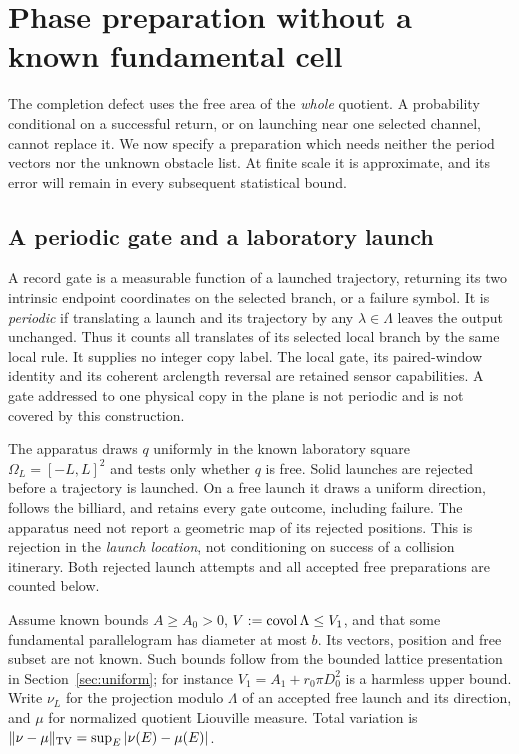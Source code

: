 \section{Phase preparation without a known fundamental cell}
\label{sec:normalization}
The completion defect uses the free area of the \emph{whole} quotient.
A probability conditional on a successful return, or on launching near
one selected channel, cannot replace it. We now specify a preparation
which needs neither the period vectors nor the unknown obstacle list.
At finite scale it is approximate, and its error will remain in every
subsequent statistical bound.

\subsection{A periodic gate and a laboratory launch}
A record gate is a measurable function of a launched trajectory, returning
its two intrinsic endpoint coordinates on the selected branch, or a
failure symbol. It is \emph{periodic} if translating a launch and its
trajectory by any $\lambda\in\Lambda$ leaves the output unchanged.
Thus it counts all translates of its selected local branch by the same
local rule. It supplies no integer copy label. The local gate, its
paired-window identity and its coherent arclength reversal are retained
sensor capabilities. A gate addressed to one physical copy in the plane
is not periodic and is not covered by this construction.

The apparatus draws $q$ uniformly in the known laboratory square
$\Omega_L=[-L,L]^2$ and tests only whether $q$ is free. Solid launches
are rejected before a trajectory is launched. On a free launch it draws
a uniform direction, follows the billiard, and retains every gate outcome,
including failure. The apparatus need not report a geometric map of its
rejected positions. This is rejection in the \emph{launch location}, not
conditioning on success of a collision itinerary. Both rejected launch
attempts and all accepted free preparations are counted below.

Assume known bounds $A\ge A_0>0$, $V:=\operatorname{covol}\Lambda\le V_1$, and
that some fundamental parallelogram has diameter at most $b$. Its vectors,
position and free subset are not known. Such bounds follow from the
bounded lattice presentation in Section~\ref{sec:uniform}; for instance
$V_1=A_1+r_0\pi D_0^2$ is a harmless upper bound. Write $\nu_L$
for the projection modulo $\Lambda$ of an accepted free launch and its
direction, and $\mu$ for normalized quotient Liouville measure. Total
variation is $\|\nu-\mu\|_{\rm TV}=\sup_E|\nu(E)-\mu(E)|$.

